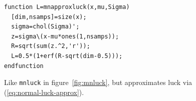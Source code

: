 \begin{figure}
\caption{\label{fig:mnapproxluck}Like {\tt mnluck} in figure~\ref{fig:mnluck}, but approximates luck via (\ref{eq:normal-luck-approx}).}
\lstset{language=Scilab}
\begin{lstlisting}
function L=mnapproxluck(x,mu,Sigma)
  [dim,nsamps]=size(x);
  sigma=chol(Sigma)';
  z=sigma\(x-mu*ones(1,nsamps));
  R=sqrt(sum(z.^2,'r'));
  L=0.5*(1+erf(R-sqrt(dim-0.5)));
endfunction
\end{lstlisting}
\end{figure}
